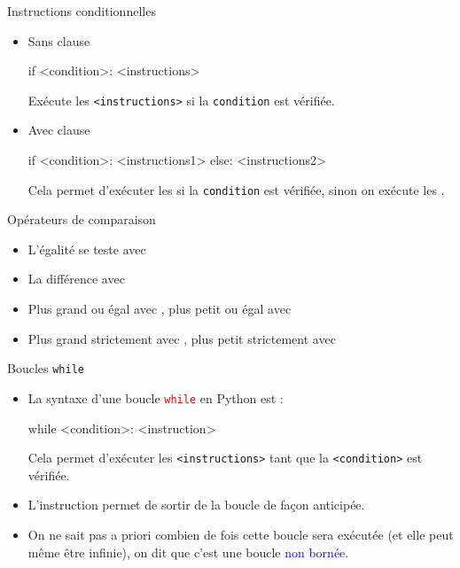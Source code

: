 \documentclass[10pt]{beamer}
\begin{document}
\begin{frame}[fragile]{\Ctitle}{\stitle}
	\begin{alertblock}{Instructions conditionnelles}
		\begin{itemize}
			\item<1-> Sans clause 
				\begin{codepython}
					if <condition>:
					<instructions>
				\end{codepython}
				Exécute les {\tt <instructions>} si la {\tt condition} est vérifiée.
			\item<2-> Avec clause 
				\begin{codepython}
					if <condition>:
					<instructions1>
					else:
					<instructions2>
				\end{codepython}
				Cela permet d'exécuter les {\tt <instructions1>} si la {\tt condition} est vérifiée, sinon on exécute les {\tt <instructions2>}.
		\end{itemize}
	\end{alertblock}
\end{frame}

\begin{frame}{\Ctitle}{\stitle}
	\begin{alertblock}{Opérateurs de comparaison}
		\begin{itemize}
			\item<1-> L'égalité se teste avec \kw{==}
			\item<2-> La différence avec \kw{!=}
			\item<3-> Plus grand ou égal avec \kw{>=}, plus petit ou égal avec \kw{<=}
			\item<4-> Plus grand strictement avec \kw{>}, plus petit strictement avec \kw{<}
		\end{itemize}
	\end{alertblock}
\end{frame}

\begin{frame}[fragile]{\Ctitle}{\stitle}
	\begin{alertblock}{Boucles {\tt while}}
		\begin{itemize}
			\item<2-> La syntaxe d'une boucle \textcolor{red}{\tt while}  en Python est :
				\begin{codepython}
					while <condition>:
					<instruction>
				\end{codepython}
				Cela permet d'exécuter les {\tt <instructions>} tant que la {\tt <condition>} est  vérifiée.
			\item<3-> L'instruction  permet de sortir de la boucle de façon anticipée.
			\item<4->  On ne sait pas a priori combien de fois cette boucle sera exécutée (et elle peut même être infinie), on dit que c'est une boucle \textcolor{blue}{non bornée}.
		\end{itemize}
	\end{alertblock}
\end{frame}
\end{document}
